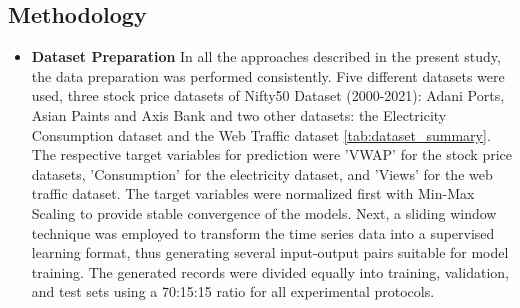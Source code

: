 \subsection{ Methodology}
\begin{itemize}
    \item \textbf{Dataset Preparation}
    In all the approaches described in the present study, the data preparation was performed consistently. Five different datasets were used, three stock price datasets of Nifty50 Dataset (2000-2021): Adani Ports, Asian Paints and Axis Bank and two other datasets: the Electricity Consumption dataset and the Web Traffic dataset \ref{tab:dataset_summary}. The respective target variables for prediction were 'VWAP' for the stock price datasets, 'Consumption' for the electricity dataset, and 'Views' for the web traffic dataset. The target variables were normalized first with Min-Max Scaling to provide stable convergence of the models. Next, a sliding window technique was employed to transform the time series data into a supervised learning format, thus generating several input-output pairs suitable for model training. The generated records were divided equally into training, validation, and test sets using a 70:15:15 ratio for all experimental protocols.


\end{itemize}
